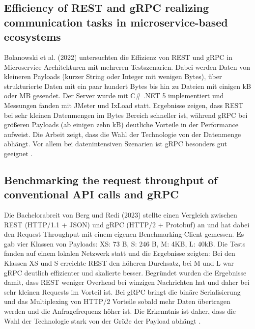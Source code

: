\subsection{Efficiency of REST and gRPC realizing communication tasks in microservice-based ecosystems}
Bolanowski et al. (2022) untersuchten die Effizienz von REST und gRPC in Microservice Architekturen mit mehreren Testszenarien. Dabei werden Daten von kleineren Payloads (kurzer String oder Integer mit wenigen Bytes), über strukturierte Daten mit ein paar hundert Bytes bis hin zu Dateien mit einigen kB oder MB gesendet. Der Server wurde mit C\# .NET 5 implementiert und Messungen fanden mit JMeter und IxLoad statt.
Ergebnisse zeigen, dass REST bei sehr kleinen Datenmengen im Bytes Bereich schneller ist, während gRPC bei größeren Payloads (ab einigen zehn kB) deutliche Vorteile in der Performance aufweist. Die Arbeit zeigt, dass die Wahl der Technologie von der Datenmenge abhängt. Vor allem bei datenintensiven Szenarien ist gRPC besonders gut geeignet \parencite{Bolanowski2022Efficiency}.

\subsection{Benchmarking the request throughput of conventional API calls and gRPC}
Die Bachelorabreit von Berg und Redi (2023) stellte einen Vergleich zwischen REST (HTTP/1.1 + JSON) und gRPC (HTTP/2 + Protobuf) an und hat dabei den Request Throughput mit einem eigenen Benchmarking-Client gemessen. Es gab vier Klassen von Payloads:
XS: 73 B, S: 246 B, M: 4KB, L: 40kB.
Die Tests fanden auf einem lokalen Netzwerk statt und die Ergebnisse zeigten: 
Bei den Klassen XS und S erreichte REST den höheren Durchsatz, bei M und L war gRPC deutlich effizienter und skalierte besser. Begründet wurden die Ergebnisse damit, dass REST weniger Overhead bei winzigen Nachrichten hat und daher bei sehr kleinen Requests im Vorteil ist. Bei gRPC bringt die binäre Serialisierung und das Multiplexing von HTTP/2 Vorteile sobald mehr Daten übertragen werden und die Anfragefrequenz höher ist. Die Erkenntnis ist daher, dass die Wahl der Technologie stark von der Größe der Payload abhängt \parencite{BergRedi2023Benchmarking}.

